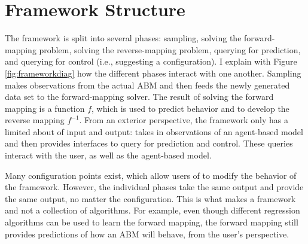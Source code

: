 \section{Framework Structure}

The framework is split into several phases: sampling, solving the forward-mapping problem, solving the reverse-mapping problem, querying for prediction, and querying for control (i.e., suggesting a configuration).
I explain with Figure \ref{fig:frameworkdiag} how the different phases interact with one another.
Sampling makes observations from the actual ABM and then feeds the newly generated data set to the forward-mapping solver.
The result of solving the forward mapping is a function $f$, which is used to predict behavior and to develop the reverse mapping $f^{-1}$.
From an exterior perspective, the framework only has a limited about of input and output:
\fw takes in observations of an agent-based model and then provides interfaces to query for prediction and control.
These queries interact with the user, as well as the agent-based model.


Many configuration points exist, which allow users of \fw to modify the behavior of the framework.
However, the individual phases take the same output and provide the same output, no matter the configuration.
This is what makes \fw a framework and not a collection of algorithms.
For example, even though different regression algorithms can be used to learn the forward mapping, the forward mapping still provides predictions of how an ABM will behave, from the user's perspective.







